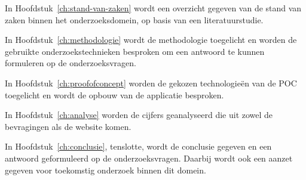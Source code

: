 In Hoofdstuk~\ref{ch:stand-van-zaken} wordt een overzicht gegeven van de stand van zaken binnen het onderzoeksdomein, op basis van een literatuurstudie.

In Hoofdstuk~\ref{ch:methodologie} wordt de methodologie toegelicht en worden de gebruikte onderzoekstechnieken besproken om een antwoord te kunnen formuleren op de onderzoeksvragen.

In Hoofdstuk~\ref{ch:proofofconcept} worden de gekozen technologieën van de POC toegelicht en wordt de opbouw van de applicatie besproken.

In Hoofdstuk~\ref{ch:analyse} worden de cijfers geanalyseerd die uit zowel de bevragingen als de website komen.

In Hoofdstuk~\ref{ch:conclusie}, tenslotte, wordt de conclusie gegeven en een antwoord geformuleerd op de onderzoeksvragen. Daarbij wordt ook een aanzet gegeven voor toekomstig onderzoek binnen dit domein.